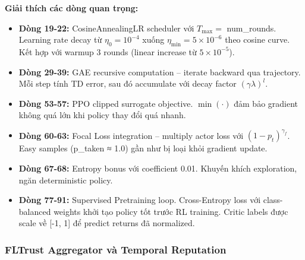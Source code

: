 \documentclass[12pt,a4paper]{article}
\begin{document}
\textbf{Giải thích các dòng quan trọng:}
\begin{itemize}
    \item \textbf{Dòng 19-22:} CosineAnnealingLR scheduler với $T_{\max}=$ num\_rounds. Learning rate decay từ $\eta_0 = 10^{-4}$ xuống $\eta_{\min} = 5 \times 10^{-6}$ theo cosine curve. Kết hợp với warmup 3 rounds (linear increase từ $5 \times 10^{-5}$).
    \item \textbf{Dòng 29-39:} GAE recursive computation -- iterate backward qua trajectory. Mỗi step tính TD error, sau đó accumulate với decay factor $(\gamma\lambda)^{l}$.
    \item \textbf{Dòng 53-57:} PPO clipped surrogate objective. $\min(\cdot)$ đảm bảo gradient không quá lớn khi policy thay đổi quá nhanh.
    \item \textbf{Dòng 60-63:} Focal Loss integration -- multiply actor loss với $(1-p_t)^{\gamma_f}$. Easy samples (p\_taken ≈ 1.0) gần như bị loại khỏi gradient update.
    \item \textbf{Dòng 67-68:} Entropy bonus với coefficient 0.01. Khuyến khích exploration, ngăn deterministic policy.
    \item \textbf{Dòng 77-91:} Supervised Pretraining loop. Cross-Entropy loss với class-balanced weights khởi tạo policy tốt trước RL training. Critic labels được scale về [-1, 1] để predict returns đã normalized.
\end{itemize}

\subsubsection{FLTrust Aggregator và Temporal Reputation}
\end{document}
